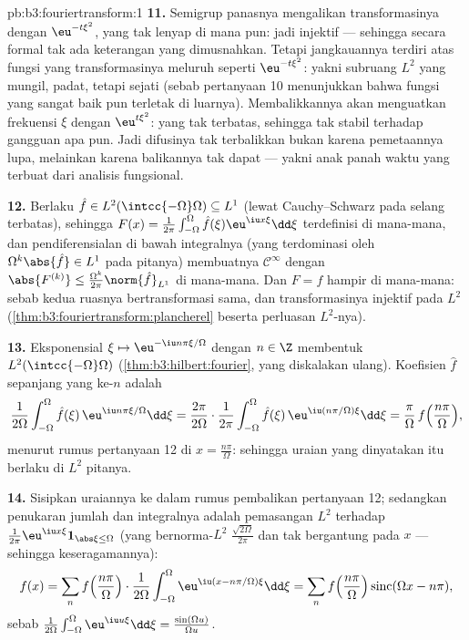 \begin{solution}{pb:b3:fouriertransform:1}
\textbf{11.} Semigrup panasnya mengalikan transformasinya dengan
$\eu^{-t\xi^2}$, yang tak lenyap di mana pun: jadi injektif ---
sehingga secara formal tak ada keterangan yang dimusnahkan. Tetapi jangkauannya terdiri atas
fungsi yang transformasinya meluruh seperti $\eu^{-t\xi^2}$: yakni
subruang $L^2$ yang mungil, padat, tetapi sejati (sebab pertanyaan 10 menunjukkan
bahwa fungsi yang sangat baik pun terletak di luarnya). Membalikkannya akan
menguatkan frekuensi $\xi$ dengan $\eu^{t\xi^2}$: yang tak terbatas,
sehingga tak stabil terhadap gangguan apa pun. Jadi difusinya
tak terbalikkan bukan karena pemetaannya lupa, melainkan karena
balikannya tak dapat  --- yakni anak panah waktu yang terbuat dari
analisis fungsional.

\textbf{12.} Berlaku $\hat f \in L^2(\intcc{-\Omega}\Omega)
\subseteq L^1$ (lewat Cauchy--Schwarz pada selang terbatas), sehingga
$F(x) = \frac1{2\pi}\int_{-\Omega}^\Omega\hat
f(\xi)\eu^{\iu x\xi}\dd\xi$ terdefinisi di mana-mana, dan
pendiferensialan di bawah integralnya (yang terdominasi oleh
$\Omega^k\abs{\hat f} \in L^1$ pada pitanya) membuatnya
$\mathcal C^\infty$ dengan $\abs{F^{(k)}} \leq
\frac{\Omega^k}{2\pi}\norm{\hat f}_{L^1}$ di mana-mana. Dan $F
= f$ hampir di mana-mana: sebab kedua ruasnya bertransformasi sama, dan
transformasinya injektif pada $L^2$
(\cref{thm:b3:fouriertransform:plancherel} beserta perluasan
$L^2$-nya).

\textbf{13.} Eksponensial $\xi \mapsto \eu^{-\iu
n\pi\xi/\Omega}$ dengan $n \in \Z$ membentuk 
$L^2(\intcc{-\Omega}\Omega)$
(\cref{thm:b3:hilbert:fourier}, yang diskalakan ulang). Koefisien
$\hat f$ sepanjang yang ke-$n$ adalah
\[
\frac1{2\Omega}\int_{-\Omega}^\Omega\hat f(\xi)\,
\eu^{\iu n\pi\xi/\Omega}\dd\xi
= \frac{2\pi}{2\Omega}\cdot
\frac1{2\pi}\int_{-\Omega}^{\Omega}\hat f(\xi)\,
\eu^{\iu(n\pi/\Omega)\xi}\dd\xi
= \frac\pi\Omega\,f\Bigl(\frac{n\pi}\Omega\Bigr),
\]
menurut rumus pertanyaan 12 di $x = \frac{n\pi}\Omega$: sehingga
uraian yang dinyatakan itu berlaku di $L^2$ pitanya.

\textbf{14.} Sisipkan uraiannya ke dalam rumus pembalikan
pertanyaan 12; sedangkan penukaran jumlah dan integralnya adalah
 pemasangan $L^2$ terhadap $\frac1{2\pi}
\eu^{\iu x\xi}\mathbf 1_{\abs\xi\leq\Omega}$ (yang bernorma-$L^2$
$\frac{\sqrt{2\Omega}}{2\pi}$ dan tak bergantung pada $x$ ---
sehingga keseragamannya):
\[
f(x) = \sum_nf\Bigl(\frac{n\pi}\Omega\Bigr)\cdot
\frac1{2\Omega}\int_{-\Omega}^\Omega
\eu^{\iu(x - n\pi/\Omega)\xi}\dd\xi
= \sum_nf\Bigl(\frac{n\pi}\Omega\Bigr)
\operatorname{sinc}(\Omega x - n\pi),
\]
sebab $\frac1{2\Omega}\int_{-\Omega}^\Omega\eu^{\iu
u\xi}\dd\xi = \frac{\sin(\Omega u)}{\Omega u}$.


\end{solution}
